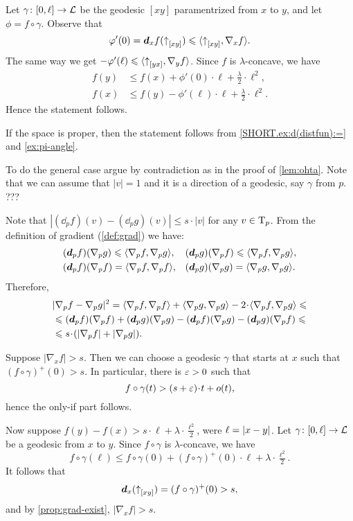 Let $\gamma\colon[0,\ell]\to \mathcal{L}$ be the geodesic $[xy]$ paramentrized from $x$ to $y$,
and let $\phi=f\circ\gamma$.
Observe that 
\[\varphi'(0)=\bm{d}_xf({\uparrow}_{[{x}{y}]})\leqslant \langle{\uparrow}_{[{x}{y}]},\nabla_{x}f\rangle.\]
The same way we get $-\varphi'(\ell)\leqslant \langle{\uparrow}_{[{y}{x}]},\nabla_{y}f\rangle$.
Since $f$ is $\lambda$-concave, we have
\begin{align*}
f(y)&\le f(x)+\phi'(0)\cdot \ell+\tfrac\lambda2\cdot\ell^2,
\\
f(x)&\le f(y)-\phi'(\ell)\cdot \ell+\tfrac\lambda2\cdot\ell^2.
\end{align*}
Hence the statement follows.

If the space is proper, then the statement follows from \ref{SHORT.ex:d(distfun):=} and \ref{ex:pi-angle}.

To do the general case argue by contradiction as in the proof of \ref{lem:ohta}.
Note that we can assume that $|v|=1$ and it is a direction of a geodesic, say $\gamma$ from $p$.
???

Note that
$|(\dd_p f)(v)-(\dd_p g)(v)|\le s\cdot|v|$
for any $v\in \mathrm{T}_p$.
From the definition of gradient (\ref{def:grad}) we have:
\begin{align*}
&(\bm{d}_p f)(\nabla_p g)\leqslant\langle\nabla_p f,\nabla_p g\rangle,
&&(\bm{d}_p g)(\nabla_p f)\leqslant\langle\nabla_p f,\nabla_p g\rangle,
\\
&(\bm{d}_p f)(\nabla_p f)=\langle\nabla_p f,\nabla_p f\rangle,
&&(\bm{d}_p g)(\nabla_p g)=\langle\nabla_p g,\nabla_p g\rangle.
\end{align*}
Therefore,
\begin{align*}
&\dist[2]{\nabla_pf}{\nabla_pg}{}
=\<\nabla_p f,\nabla_p f\>+\<\nabla_p g,\nabla_p g\>-2\cdot\<\nabla_p f,\nabla_p g\>
\le
\\
&\le (\dd_p f)(\nabla_p f)+(\dd_p g)(\nabla_p g)-
(\dd_p f)(\nabla_p g)-(\dd_p g)(\nabla_p f)
\le
\\
&\le s\cdot(|\nabla_p f|+|\nabla_p g|).
\end{align*}

Suppose $|\nabla_xf|> s$.
Then we can choose a geodesic $\gamma$ that starts at $x$ such that 
$(f\circ\gamma)^+(0)>s$.
In particular, there is $\varepsilon>0$ such that
\[f\circ\gamma(t)>(s+\eps)\cdot t+o(t),\]
hence the only-if part follows.

Now suppose $f(y)-f(x)>s\cdot \ell+\lambda\cdot \tfrac{\ell^2}2$,
were $\ell=\dist{x}{y}{}$.
Let $\gamma\colon[0,\ell]\to \mathcal{L}$ be a geodesic from $x$ to $y$.
Since $f\circ\gamma$ is $\lambda$-concave, we have
\[f\circ\gamma(\ell)\le f\circ\gamma(0)+(f\circ\gamma)^+(0)\cdot\ell+\lambda\cdot \tfrac{\ell^2}2.\]
It follows that 
\[\bm{d}_x({\uparrow}_{[{x}{y}]})=(f\circ\gamma)^+(0)>s,\]
and by \ref{prop:grad-exist}, $|\nabla_x f|>s$.

